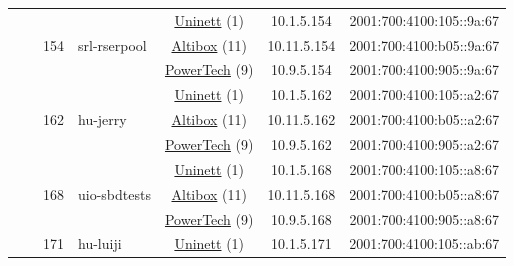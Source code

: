 \begin{small}
\begin{center}
\begin{longtable}{|c|c|c|c|c|c|c|c|}
  &  & \multirow{3}{*}{\tiny{154}} & \multicolumn{1}{|l|}{\multirow{3}{*}{\tiny{srl-rserpool}}} & \multicolumn{2}{|c|}{\tiny{\href{https://www.uninett.no}{Uninett} (1)}} & \tiny{10.1.5.154} & \tiny{2001:700:4100:105::9a:67} \\* \cline{5-5}\cline{6-6}\cline{7-7}\cline{8-8}
  &  &  &  & \multicolumn{2}{|c|}{\tiny{\href{https://www.altibox.no}{Altibox} (11)}} & \tiny{10.11.5.154} & \tiny{2001:700:4100:b05::9a:67} \\* \cline{5-5}\cline{6-6}\cline{7-7}\cline{8-8}
  &  &  &  & \multicolumn{2}{|c|}{\tiny{\href{http://www.powertech.no}{PowerTech} (9)}} & \tiny{10.9.5.154} & \tiny{2001:700:4100:905::9a:67} \\* \cline{3-3}\cline{4-4}\cline{5-5}\cline{6-6}\cline{7-7}\cline{8-8}
  &  & \multirow{3}{*}{\tiny{162}} & \multicolumn{1}{|l|}{\multirow{3}{*}{\tiny{hu-jerry}}} & \multicolumn{2}{|c|}{\tiny{\href{https://www.uninett.no}{Uninett} (1)}} & \tiny{10.1.5.162} & \tiny{2001:700:4100:105::a2:67} \\* \cline{5-5}\cline{6-6}\cline{7-7}\cline{8-8}
  &  &  &  & \multicolumn{2}{|c|}{\tiny{\href{https://www.altibox.no}{Altibox} (11)}} & \tiny{10.11.5.162} & \tiny{2001:700:4100:b05::a2:67} \\* \cline{5-5}\cline{6-6}\cline{7-7}\cline{8-8}
  &  &  &  & \multicolumn{2}{|c|}{\tiny{\href{http://www.powertech.no}{PowerTech} (9)}} & \tiny{10.9.5.162} & \tiny{2001:700:4100:905::a2:67} \\* \cline{3-3}\cline{4-4}\cline{5-5}\cline{6-6}\cline{7-7}\cline{8-8}
  &  & \multirow{3}{*}{\tiny{168}} & \multicolumn{1}{|l|}{\multirow{3}{*}{\tiny{uio-sbdtests}}} & \multicolumn{2}{|c|}{\tiny{\href{https://www.uninett.no}{Uninett} (1)}} & \tiny{10.1.5.168} & \tiny{2001:700:4100:105::a8:67} \\* \cline{5-5}\cline{6-6}\cline{7-7}\cline{8-8}
  &  &  &  & \multicolumn{2}{|c|}{\tiny{\href{https://www.altibox.no}{Altibox} (11)}} & \tiny{10.11.5.168} & \tiny{2001:700:4100:b05::a8:67} \\* \cline{5-5}\cline{6-6}\cline{7-7}\cline{8-8}
  &  &  &  & \multicolumn{2}{|c|}{\tiny{\href{http://www.powertech.no}{PowerTech} (9)}} & \tiny{10.9.5.168} & \tiny{2001:700:4100:905::a8:67} \\* \cline{3-3}\cline{4-4}\cline{5-5}\cline{6-6}\cline{7-7}\cline{8-8}
  &  & \multirow{3}{*}{\tiny{171}} & \multicolumn{1}{|l|}{\multirow{3}{*}{\tiny{hu-luiji}}} & \multicolumn{2}{|c|}{\tiny{\href{https://www.uninett.no}{Uninett} (1)}} & \tiny{10.1.5.171} & \tiny{2001:700:4100:105::ab:67} \\* \cline{5-5}\cline{6-6}\cline{7-7}\cline{8-8}

\end{longtable}
\end{center}
\end{small}
